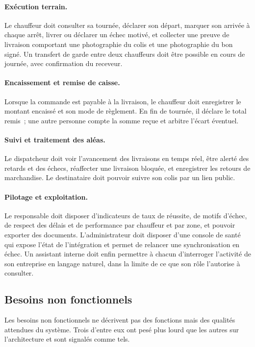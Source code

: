 \paragraph*{Exécution terrain.} Le chauffeur doit consulter sa tournée, déclarer son départ, marquer
son arrivée à chaque arrêt, livrer ou déclarer un échec motivé, et collecter une preuve de livraison
comportant une photographie du colis et une photographie du bon signé. Un
transfert de garde entre deux chauffeurs doit être possible en cours de journée, avec confirmation
du receveur.

\paragraph*{Encaissement et remise de caisse.} Lorsque la commande est payable à la livraison, le
chauffeur doit enregistrer le montant encaissé et son mode de règlement. En fin de tournée, il
déclare le total remis~; une autre personne compte la somme reçue et arbitre l'écart éventuel.

\paragraph*{Suivi et traitement des aléas.} Le dispatcheur doit voir l'avancement des livraisons en
temps réel, être alerté des retards et des échecs, réaffecter une livraison bloquée, et enregistrer
les retours de marchandise. Le destinataire doit pouvoir suivre son colis par un lien public.

\paragraph*{Pilotage et exploitation.} Le responsable doit disposer d'indicateurs de taux de réussite,
de motifs d'échec, de respect des délais et de performance par chauffeur et par zone, et pouvoir exporter des
documents. L'administrateur doit disposer d'une console de santé qui expose l'état de l'intégration et
permet de relancer une synchronisation en échec. Un assistant interne doit enfin permettre à
chacun d'interroger l'activité de son entreprise en langage naturel, dans la limite de ce que
son rôle l'autorise à consulter.

\subsection{Besoins non fonctionnels}

Les besoins non fonctionnels ne décrivent pas des fonctions mais des qualités attendues du système.
Trois d'entre eux ont pesé plus lourd que les autres sur l'architecture et sont signalés comme tels.

